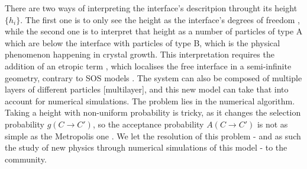 There are two ways of interpreting the interface's descritpion throught its height $\{h_i\}$. The first one is to only see the height as the interface's degrees of freedom \cite{gilmer_computer_1972,gilmer_simulation_1972}, while the second one is to interpret that height as a number of particles of type A which are below the interface with particles of type B, which is the physical phenomenon happening in crystal growth. This interpretation requires the addition of an etropic term \cite{temperley_statistical_1952}, which localises the free interface in a semi-infinite geometry, contrary to SOS models \cite{chui_pinning_1981}. The system can also be composed of multiple layers of different particles [multilayer], and this new model can take that into account for numerical simulations. 
The problem lies in the numerical algorithm. Taking a height with non-uniform probability is tricky, as it changes the selection probability $g(C\to C')$, so the acceptance probability $A(C\to C')$ is not as simple as the Metropolis one \cite{metropolis_monte_1949,newman_monte_1999}. We let the resolution of this problem - and as such the study of new physics through numerical simulations of this model - to the community. 
